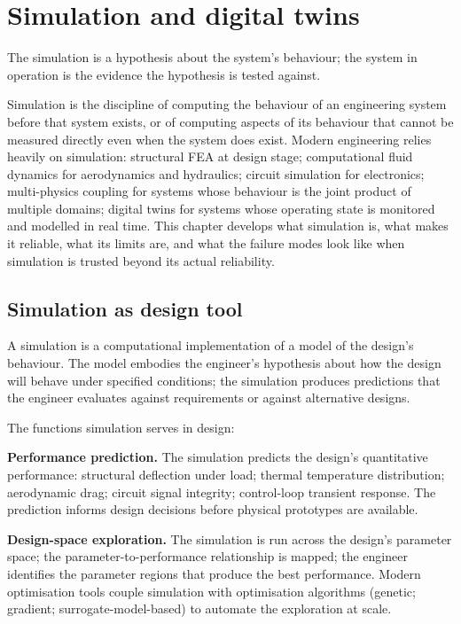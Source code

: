 \chapter{Simulation and digital twins}
\label{vol11:ch06}

\epigraph{The simulation is a hypothesis about the system's behaviour; the system in operation is the evidence the hypothesis is tested against.}{}


\noindent
Simulation is the discipline of computing the behaviour of an engineering system before that system exists, or of computing aspects of its behaviour that cannot be measured directly even when the system does exist. Modern engineering relies heavily on simulation: structural FEA at design stage; computational fluid dynamics for aerodynamics and hydraulics; circuit simulation for electronics; multi-physics coupling for systems whose behaviour is the joint product of multiple domains; digital twins for systems whose operating state is monitored and modelled in real time. This chapter develops what simulation is, what makes it reliable, what its limits are, and what the failure modes look like when simulation is trusted beyond its actual reliability.

\section{Simulation as design tool}

A simulation is a computational implementation of a model of the design's behaviour. The model embodies the engineer's hypothesis about how the design will behave under specified conditions; the simulation produces predictions that the engineer evaluates against requirements or against alternative designs.

The functions simulation serves in design:

\textbf{Performance prediction.} The simulation predicts the design's quantitative performance: structural deflection under load; thermal temperature distribution; aerodynamic drag; circuit signal integrity; control-loop transient response. The prediction informs design decisions before physical prototypes are available.

\textbf{Design-space exploration.} The simulation is run across the design's parameter space; the parameter-to-performance relationship is mapped; the engineer identifies the parameter regions that produce the best performance. Modern optimisation tools couple simulation with optimisation algorithms (genetic; gradient; surrogate-model-based) to automate the exploration at scale.

